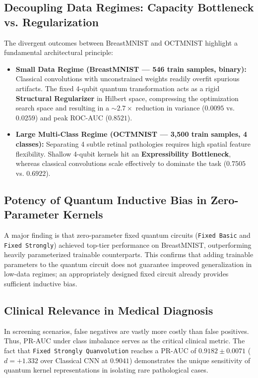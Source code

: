 \documentclass[runningheads]{llncs}
\begin{document}
\subsection{Decoupling Data Regimes: Capacity Bottleneck vs. Regularization}
The divergent outcomes between BreastMNIST and OCTMNIST highlight a fundamental architectural principle:
\begin{itemize}
    \item \textbf{Small Data Regime (BreastMNIST --- 546 train samples, binary):} Classical convolutions with unconstrained weights readily overfit spurious artifacts. The fixed 4-qubit quantum transformation acts as a rigid \textbf{Structural Regularizer} in Hilbert space, compressing the optimization search space and resulting in a $\sim 2.7\times$ reduction in variance ($0.0095$ vs. $0.0259$) and peak ROC-AUC ($0.8521$).
    \item \textbf{Large Multi-Class Regime (OCTMNIST --- 3,500 train samples, 4 classes):} Separating 4 subtle retinal pathologies requires high spatial feature flexibility. Shallow 4-qubit kernels hit an \textbf{Expressibility Bottleneck}, whereas classical convolutions scale effectively to dominate the task ($0.7505$ vs. $0.6922$).
\end{itemize}

\subsection{Potency of Quantum Inductive Bias in Zero-Parameter Kernels}
A major finding is that zero-parameter fixed quantum circuits (\texttt{Fixed Basic} and \texttt{Fixed Strongly}) achieved top-tier performance on BreastMNIST, outperforming heavily parameterized trainable counterparts. This confirms that adding trainable parameters to the quantum circuit does not guarantee improved generalization in low-data regimes; an appropriately designed fixed circuit already provides sufficient inductive bias.

\subsection{Clinical Relevance in Medical Diagnosis}
In screening scenarios, false negatives are vastly more costly than false positives. Thus, PR-AUC under class imbalance serves as the critical clinical metric. The fact that \texttt{Fixed Strongly Quanvolution} reaches a PR-AUC of $\mathbf{0.9182 \pm 0.0071}$ ($d = +1.332$ over Classical CNN at $0.9041$) demonstrates the unique sensitivity of quantum kernel representations in isolating rare pathological cases.
\end{document}
